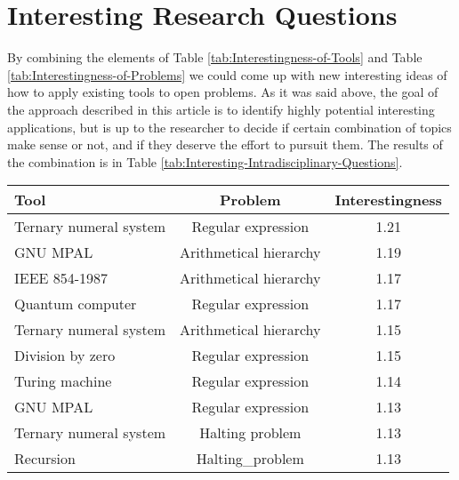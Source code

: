 %
%

\section{Interesting Research Questions}

By combining the elements of Table \ref{tab:Interestingness-of-Tools}
and Table \ref{tab:Interestingness-of-Problems} we could come up
with new interesting ideas of how to apply existing tools to open
problems. As it was said above, the goal of the approach described
in this article is to identify highly potential interesting applications,
but is up to the researcher to decide if certain combination of topics
make sense or not, and if they deserve the effort to pursuit them.
The results of the combination is in Table \ref{tab:Interesting-Intradisciplinary-Questions}.

\begin{table*}
\begin{centering}
\begin{tabular}{|l|c|c|}
\hline 
{Tool} & Problem & Interestingness\tabularnewline
\hline 
\hline 
Ternary numeral system & Regular expression & 1.21\tabularnewline
\hline 
{GNU MPAL} & Arithmetical hierarchy & 1.19\tabularnewline
\hline 
IEEE 854-1987 & Arithmetical hierarchy & 1.17\tabularnewline
\hline 
Quantum computer & Regular expression & 1.17\tabularnewline
\hline 
Ternary numeral system & Arithmetical hierarchy & 1.15\tabularnewline
\hline 
Division by zero & Regular expression & 1.15\tabularnewline
\hline 
Turing machine & Regular expression & 1.14\tabularnewline
\hline 
GNU MPAL & Regular expression & 1.13\tabularnewline
\hline 
Ternary numeral system & Halting problem & 1.13\tabularnewline
\hline 
Recursion & Halting\_problem & 1.13\tabularnewline
\hline 
\end{tabular}
\par\end{centering}

\caption{\label{tab:Interesting-Intradisciplinary-Questions}Interesting Intradisciplinary
Questions}
\end{table*}

